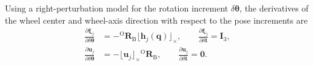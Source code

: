 \documentclass[journal,twoside,web]{ieeecolor}
\begin{document}
Using a right-perturbation model for the rotation increment \(\delta\boldsymbol{\theta}\), the derivatives of the wheel center and wheel-axis direction with respect to the pose increments are
\begin{equation}
\begin{aligned}
\frac{\partial \bm{\xi}_j}{\partial \delta\boldsymbol{\theta}}
&=
-{}^{\mathrm{O}}\mathbf{R}_\mathrm{B}\lfloor\mathbf{h}_j(\mathbf{q})\rfloor_{\times},
\qquad
\frac{\partial \bm{\xi}_j}{\partial \delta\mathbf{t}}
=
\mathbf{I}_3,\\
\frac{\partial \mathbf{u}_j}{\partial \delta\boldsymbol{\theta}}
&=
-\lfloor\mathbf{u}_j\rfloor_{\times}{}^{\mathrm{O}}\mathbf{R}_\mathrm{B},
\qquad
\frac{\partial \mathbf{u}_j}{\partial \delta\mathbf{t}}
=
\mathbf{0}.
\end{aligned}
\end{equation}
\end{document}
